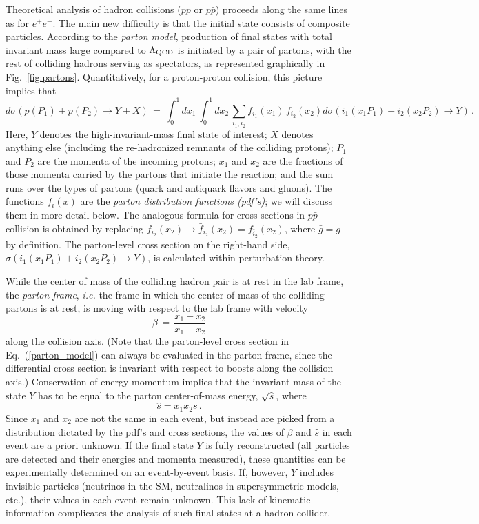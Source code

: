 \documentclass{ws-procs9x6}
\def\beq{\begin{equation}}
\def\eeq#1{\label{#1}\end{equation}}
\def\leqn#1{(\ref{#1})}
\begin{document}
Theoretical analysis of hadron collisions ($pp$ or $p\bar{p}$) proceeds along the same lines as for $e^+e^-$. The main new difficulty is that the initial state consists of composite particles. According to the {\it parton model}, production of final states with total invariant mass large compared to $\Lambda_{\rm QCD}$ is initiated by a pair of partons, with the rest of colliding hadrons serving as spectators, as represented graphically in Fig.~\ref{fig:partons}. Quantitatively, for a proton-proton collision, this picture implies that
\beq
d\sigma(p(P_1)+p(P_2)\to Y+X) \,=\, \int_0^1 dx_1 \, \int_0^1 dx_2 
\, \sum_{i_1, i_2} f_{i_1}(x_1) \,f_{i_2}(x_2) d\sigma(i_1(x_1P_1) + i_2(x_2P_2) \to Y)\,.
\eeq{parton_model}
Here, $Y$ denotes the high-invariant-mass final state of interest; $X$ denotes anything else (including the re-hadronized remnants of the colliding protons); $P_1$ and $P_2$ are the momenta of the incoming protons; $x_1$ and $x_2$ are the fractions of those momenta carried by the partons that initiate the reaction; and the sum runs over the types of partons (quark and antiquark flavors and gluons). The functions $f_i(x)$ are the {\it parton distribution functions (pdf's)}; we will discuss them in more detail below. The analogous formula for cross sections in $p\bar{p}$ collision is obtained by replacing $f_{i_2}(x_2) \to \bar{f}_{i_2}(x_2) = f_{\bar{i}_2}(x_2)$, where $\bar{g}=g$ by definition. The parton-level cross section on the right-hand side, $\sigma(i_1(x_1P_1) + i_2(x_2P_2) \to Y)$, is calculated within perturbation theory. 

While the center of mass of the colliding hadron pair is at rest in the lab frame, the {\it parton frame}, {\it i.e.} the frame in which the center of mass of the colliding partons is at rest, is moving with respect to the lab frame with velocity
\beq
\beta\,=\,\frac{x_1-x_2}{x_1+x_2}
\eeq{beta} 
along the collision axis. (Note that the parton-level cross section in Eq.~\leqn{parton_model} can always be evaluated in the parton frame, since the differential cross section is invariant with respect to boosts along the collision axis.) Conservation of energy-momentum implies that the invariant mass of the state $Y$ has to be equal to the parton center-of-mass energy, $\sqrt{\hat{s}}$, where
\beq
\hat{s}=x_1x_2 s\,.
\eeq{shat}
Since $x_1$ and $x_2$ are not the same  in each event, but instead are picked from a distribution dictated by the pdf's and cross sections, the values of $\beta$ and $\hat{s}$ in each event are a priori unknown. If the final state $Y$ is fully reconstructed (all particles are detected and their energies and momenta measured), these quantities can be experimentally determined on an event-by-event basis. If, however, $Y$ includes invisible particles (neutrinos in the SM, neutralinos in supersymmetric models, {\rm etc.}), their values in each event remain unknown. This lack of kinematic information complicates the analysis of such final states at a hadron collider.  
\end{document}
